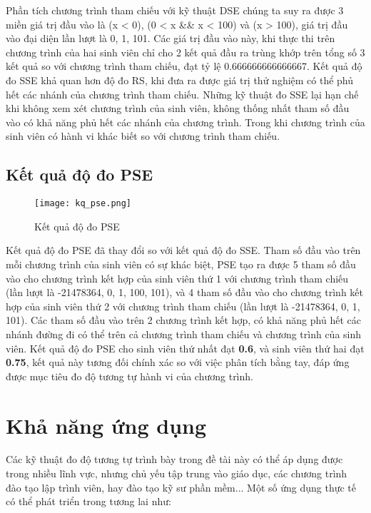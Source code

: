 Phần tích chương trình tham chiếu với kỹ thuật DSE chúng ta suy ra được 3 miền giá trị đầu vào là (x < 0), (0 < x \&\& x < 100) và (x > 100), giá trị đầu vào đại diện lần lượt là 0, 1, 101. Các giá trị đầu vào này, khi thực thi trên chương trình của hai sinh viên chỉ cho 2 kết quả đầu ra trùng khớp trên tổng số 3 kết quả so với chương trình tham chiếu, đạt tỷ lệ 0.666666666666667. Kết quả độ đo SSE khả quan hơn độ đo RS, khi đưa ra được giá trị thử nghiệm có thể phủ hết các nhánh của chương trình tham chiếu. Những kỹ thuật đo SSE lại hạn chế khi không xem xét chương trình của sinh viên, không thống nhất tham số đầu vào có khả năng phủ hết các nhánh của chương trình. Trong khi chương trình của sinh viên có hành vi khác biết so với chương trình tham chiếu.

\subsection{Kết quả độ đo PSE}
\begin{center}
	\begin{figure}[htp]
		\begin{center}
			\texttt{[image: kq\_pse.png]}
		\end{center}
		\caption{Kết quả độ đo PSE}		
	\end{figure}
\end{center}

Kết quả độ đo PSE đã thay đổi so với kết quả độ đo SSE. Tham số đầu vào trên mỗi chương trình của sinh viên có sự khác biệt, PSE tạo ra được 5 tham số đầu vào cho chương trình kết hợp của sinh viên thứ 1 với chương trình tham chiếu (lần lượt là  -21478364, 0, 1, 100, 101), và 4 tham số đầu vào cho chương trình kết hợp của sinh viên thứ 2 với chương trình tham chiếu (lần lượt là  -21478364, 0, 1, 101). Các tham số đầu vào trên 2 chương trình kết hợp, có khả năng phủ hết các nhánh đường đi có thể trên cả chương trình tham chiếu và chương trình của sinh viên. Kết quả độ đo PSE cho sinh viên thứ nhất đạt \textbf{0.6}, và sinh viên thứ hai đạt \textbf{0.75}, kết quả này tương đối chính xác so với việc phân tích bằng tay, đáp ứng được mục tiêu đo độ tương tự hành vi của chương trình.

\section{Khả năng ứng dụng}
Các kỹ thuật đo độ tương tự trình bày trong đề tài này có thể áp dụng được trong nhiều lĩnh vực, nhưng chủ yếu tập trung vào giáo dục, các chương trình đào tạo lập trình viên, hay đào tạo kỹ sư phần mềm... Một số ứng dụng thực tế có thể phát triển trong tương lai như: 

